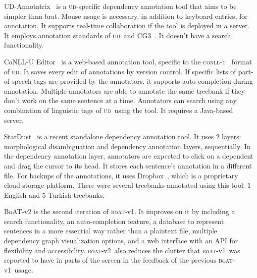 \documentclass{elektr}
\newcommand{\conllu}{\textsc{c}o\textsc{nll-u}}
\newcommand{\boatvone}{\textsc{b}o\textsc{at}-{\scriptsize v1}}
\newcommand{\boatvtwo}{\textsc{b}o\textsc{at}-{\scriptsize v2}}
\newcommand{\ud}{\textsc{ud}}
\begin{document}
UD-Annotatrix~\cite{ud-annotatrix} is a \ud-specific dependency annotation tool that aims to be simpler than brat.
Mouse usage is necessary, in addition to keyboard entries, for annotation.
It supports real-time collaboration if the tool is deployed in a server.
It employs annotation standards of \ud\ and CG3~\cite{cg3}.
It doesn't have a search functionality.

CoNLL-U Editor~\cite{conll-u_editor} is a web-based annotation tool, specific to the \conllu~\cite{conll} format of \ud.
It saves every edit of annotations by version control.
If specific lists of part-of-speech tags are provided by the annotators, it supports auto-completion during annotation.
Multiple annotators are able to annotate the same treebank if they don't work on the same sentence at a time.
Annotators can search using any combination of linguistic tags of \ud\ using the tool.
It requires a Java-based server.

StarDust~\cite{stardust} is a recent standalone dependency annotation tool.
It uses 2 layers: morphological disambiguation and dependency annotation layers, sequentially.
In the dependency annotation layer, annotators are expected to click on a dependent and drag the cursor to its head.
It stores each sentence's annotation in a different file.
For backups of the annotations, it uses Dropbox~\cite{dropbox}, which is a proprietary cloud storage platform.
There were several treebanks annotated using this tool: 1 English and 5 Turkish treebanks.

BoAT-v2 is the second iteration of \boatvone.
It improves on it by including a search functionality, an auto-completion feature, a database to represent sentences in a more essential way rather than a plaintext file, multiple dependency graph visualization options, and a web interface with an API for flexibility and accessibility.
\boatvtwo\ also reduces the clutter that \boatvone\ was reported to have in parts of the screen in the feedback of the previous \boatvone\ usage.
\end{document}
